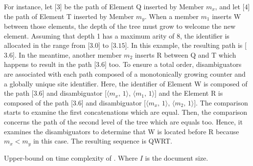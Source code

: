 \begin{asparadesc}
  For instance, let [$3$] be the path of Element Q inserted by Member $m_x$, and let
  [$4$] the path of Element T inserted by Member $m_y$. When a member $m_1$ inserts W
  between those elements, the depth of the tree must grow to welcome the new
  element. Assuming that depth 1 has a maximum arity of 8, the identifier is
  allocated in the range from [$3.0$] to [$3.15$].  In this example, the resulting
  path is [$3.6$]. In the meantime, another member $m_2$ inserts R between Q and T
  which happens to result in the path [$3.6$] too. To ensure a total order,
  disambiguators are associated with each path composed of a monotonically
  growing counter and a globally unique site identifier. Here, the identifier of
  Element W is composed of the path [$3.6$] and disambiguator
  [$\langle m_x,\,1\rangle$, $\langle m_1,\,1\rangle$] and the Element R is composed of
  the path [$3.6$] and disambiguator [$\langle m_x,\,1\rangle$,
  $\langle m_2,\,1\rangle$].  The comparison starts to examine the first
  concatenations which are equal.  Then, the comparison concerns the path of the
  second level of the tree which are equals too. Hence, it examines the
  disambiguators to determine that W is located before R because $m_x < m_y$ in
  this case. The resulting sequence is QWRT.  
\end{asparadesc}

\begin{table}
  \centering
  
  \caption{\label{table:lseqtime}
    Upper-bound on time complexity of \LSEQ. Where $I$ is the document size.}
\end{table}




